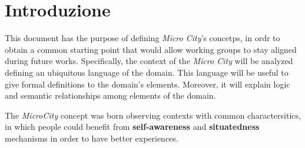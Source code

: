 \section*{Introduzione}
\label{sec:introduction}

This document has the purpose of defining \textit{Micro City}'s concetps, in ordr to obtain a common starting point that would allow working groups to stay aligned during future works. Specifically, the context of the \textit{Micro City} will be analyzed defining an ubiquitous language of the domain. This language will be useful to give formal definitions to the domain's elements. Moreover, it will explain logic and semantic relationships among elements of the domain.

The \textit{MicroCity} concept was born observing contexts with common charactersitics, in which people could benefit from \textbf{self-awareness} and \textbf{situatedness} mechanisms in order to have better experiences.

